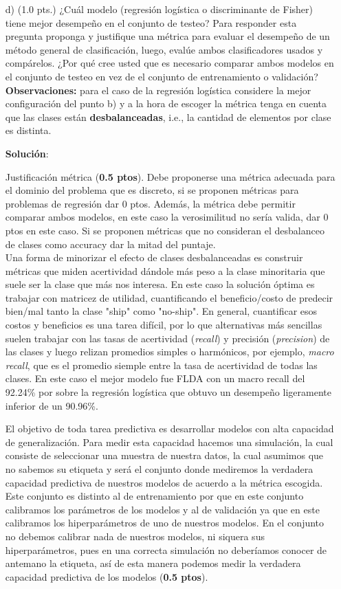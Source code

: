 \documentclass[11pt,letterpaper]{article}
\begin{document}
\begin{enumerate}
\item[d)] (1.0 pts.) ¿Cuál modelo (regresión logística o  discriminante de Fisher) tiene mejor desempeño en el conjunto de testeo? Para responder esta pregunta proponga y justifique una métrica para evaluar el desempeño de un método general de clasificación, luego, evalúe ambos clasificadores usados y compárelos. ¿Por qué cree usted que es necesario comparar ambos modelos en el conjunto de testeo en vez de el conjunto de entrenamiento o validación?
\\\textbf{Observaciones:} para el caso de la regresión logística considere la mejor configuración del punto b) y a la hora de escoger la métrica tenga en cuenta que las clases están \textbf{desbalanceadas}, i.e., la cantidad de elementos por clase es distinta.

\textbf{Solución}:

Justificación métrica (\textbf{0.5 ptos}). Debe proponerse una métrica adecuada para el dominio del problema que es discreto, si se proponen métricas para problemas de regresión dar 0 ptos. Además, la métrica debe permitir comparar ambos modelos, en este caso la verosimilitud no sería valida, dar 0 ptos en este caso. Si se proponen métricas que no consideran el desbalanceo de clases como accuracy dar la mitad del puntaje.\\ 

Una forma de minorizar el efecto de clases desbalanceadas es construir métricas que miden acertividad dándole más peso a la clase minoritaria que suele ser la clase que más nos interesa. En este caso la solución óptima es trabajar con matricez de utilidad, cuantificando el beneficio/costo de predecir bien/mal tanto la clase "ship" como "no-ship". En general, cuantificar esos costos y beneficios es una tarea difícil, por lo que alternativas más sencillas suelen trabajar con las tasas de acertividad (\textit{recall}) y precisión (\textit{precision}) de las clases y luego relizan promedios simples o harmónicos, por ejemplo, \textit{macro recall}, que es el promedio siemple entre la tasa de acertividad de todas las clases. En este caso el mejor modelo fue FLDA con un macro recall del 92.24\% por sobre la regresión logística que obtuvo un desempeño ligeramente inferior de un 90.96\%. 

El objetivo de toda tarea predictiva es desarrollar modelos con alta capacidad de generalización. Para medir esta capacidad hacemos una simulación, la cual consiste de seleccionar una muestra de nuestra datos, la cual asumimos que no sabemos su etiqueta y será el conjunto donde mediremos la verdadera capacidad predictiva de nuestros modelos de acuerdo a la métrica escogida. Este conjunto es distinto al de entrenamiento por que en este conjunto calibramos los parámetros de los modelos y al de validación ya que en este calibramos los hiperparámetros de uno de nuestros modelos. En el conjunto no debemos calibrar nada de nuestros modelos, ni siquera sus hiperparámetros, pues en una correcta simulación no deberíamos conocer de antemano la etiqueta, así de esta manera podemos medir la verdadera capacidad predictiva de los modelos (\textbf{0.5 ptos}).


\end{enumerate}
\end{document}
